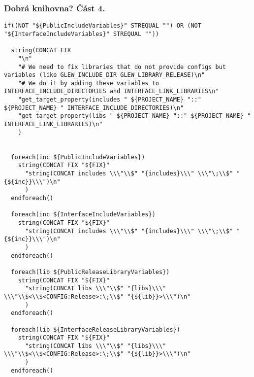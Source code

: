 \begin{frame}[fragile]
\frametitle{Dobrá knihovna? Část 4.}
{\fontsize{2}{2}
\begin{verbatim}
if((NOT "${PublicIncludeVariables}" STREQUAL "") OR (NOT "${InterfaceIncludeVariables}" STREQUAL ""))

  string(CONCAT FIX
    "\n"
    "# We need to fix libraries that do not provide configs but variables (like GLEW_INCLUDE_DIR GLEW_LIBRARY_RELEASE)\n"
    "# We do it by adding these variables to INTERFACE_INCLUDE_DIRECTORIES and INTERFACE_LINK_LIBRARIES\n"
    "get_target_property(includes " ${PROJECT_NAME} "::" ${PROJECT_NAME} " INTERFACE_INCLUDE_DIRECTORIES)\n"
    "get_target_property(libs " ${PROJECT_NAME} "::" ${PROJECT_NAME} " INTERFACE_LINK_LIBRARIES)\n"
    )
  
  
  foreach(inc ${PublicIncludeVariables})
    string(CONCAT FIX "${FIX}"
      "string(CONCAT includes \\\"\\$" "{includes}\\\" \\\"\;\\$" "{${inc}}\\\")\n"
      )
  endforeach()
  
  foreach(inc ${InterfaceIncludeVariables})
    string(CONCAT FIX "${FIX}"
      "string(CONCAT includes \\\"\\$" "{includes}\\\" \\\"\;\\$" "{${inc}}\\\")\n"
      )
  endforeach()
  
  foreach(lib ${PublicReleaseLibraryVariables})
    string(CONCAT FIX "${FIX}"
      "string(CONCAT libs \\\"\\$" "{libs}\\\" \\\"\\$<\\$<CONFIG:Release>:\;\\$" "{${lib}}>\\\")\n"
      )
  endforeach()
  
  foreach(lib ${InterfaceReleaseLibraryVariables})
    string(CONCAT FIX "${FIX}"
      "string(CONCAT libs \\\"\\$" "{libs}\\\" \\\"\\$<\\$<CONFIG:Release>:\;\\$" "{${lib}}>\\\")\n"
      )
  endforeach()
  

\end{verbatim}}
\end{frame}
